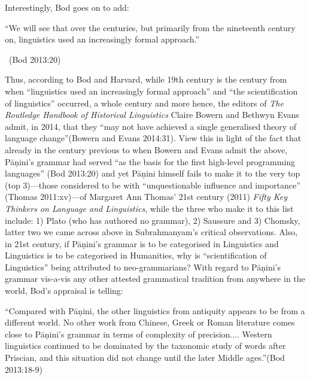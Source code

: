 Interestingly, Bod goes on to add:

\begin{myquote}
“We will see that over the centuries, but primarily from the nineteenth century on, linguistics used an increasingly formal approach.”

~\hfill (Bod 2013:20)
\end{myquote}

Thus, according to Bod and Harvard, while 19th century is the century from when “linguistics used an increasingly formal approach” and “the scientification of linguistics” occurred, a whole century and more hence, the editors of \textit{The Routledge Handbook of Historical Linguistics} Claire Bowern and Bethwyn Evans admit, in 2014, that they “may not have achieved a single generalised theory of language change”(Bowern and Evans 2014:31). View this in light of the fact that already in the century previous to when Bowern and Evans admit the above, Pāṇini’s grammar had served “as the basis for the first high-level programming languages” (Bod 2013:20) and yet Pāṇini himself fails to make it to the very top (top 3)—those considered to be with “unquestionable influence and importance” (Thomas 2011:xv)—of Margaret Ann Thomas’ 21st century (2011) \textit{Fifty Key Thinkers on Language and Linguistics}, while the three who make it to this list include: 1) Plato (who has authored no grammar), 2) Saussure and 3) Chomsky, latter two we came across above in Subrahmanyam’s critical observations. Also, in 21st century, if Pāṇini’s grammar is to be categorised in Linguistics and Linguistics is to be categorised in Humanities, why is “scientification of Linguistics” being attributed to neo-grammarians? With regard to Pāṇini’s grammar vis-a-vis any other attested grammatical tradition from anywhere in the world, Bod’s appraisal is telling:

\newpage

\begin{myquote}
“Compared with Pāṇini, the other linguistics from antiquity appears to be from a different world. No other work from Chinese, Greek or Roman literature comes close to Pāṇini’s grammar in terms of complexity of precision.... Western linguistics continued to be dominated by the taxonomic study of words after Priscian, and this situation did not change until the later Middle ages.”\hfill (Bod 2013:18-9)
\end{myquote}


